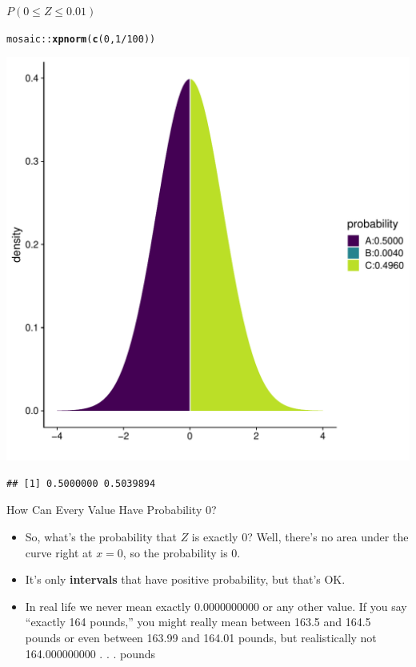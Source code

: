 \documentclass[10pt,handout]{beamer}\usepackage[]{graphicx}\usepackage[]{color}
\makeatletter
\newcommand{\hlnum}[1]{\textcolor[rgb]{0.686,0.059,0.569}{#1}}%
\newcommand{\hlopt}[1]{\textcolor[rgb]{0,0,0}{#1}}%
\newcommand{\hlstd}[1]{\textcolor[rgb]{0.345,0.345,0.345}{#1}}%
\newcommand{\hlkwd}[1]{\textcolor[rgb]{0.737,0.353,0.396}{\textbf{#1}}}%
\newenvironment{kframe}{%
 \def\at@end@of@kframe{}%
 \ifinner\ifhmode%
  \def\at@end@of@kframe{\end{minipage}}%
  \begin{minipage}{\columnwidth}%
 \fi\fi%
 \def\FrameCommand##1{\hskip\@totalleftmargin \hskip-\fboxsep
 \colorbox{shadecolor}{##1}\hskip-\fboxsep
     \hskip-\linewidth \hskip-\@totalleftmargin \hskip\columnwidth}%
 \MakeFramed {\advance\hsize-\width
   \@totalleftmargin\z@ \linewidth\hsize
   \@setminipage}}%
 {\par\unskip\endMakeFramed%
 \at@end@of@kframe}
\newenvironment{knitrout}{}{} %
\makeatother
\begin{document}
\begin{frame}[fragile]{$P(0 \leq Z \leq 0.01)$}

	
\begin{knitrout}\tiny
{}\color{fgcolor}\begin{kframe}
\begin{alltt}
\hlstd{mosaic}\hlopt{::}\hlkwd{xpnorm}\hlstd{(}\hlkwd{c}\hlstd{(}\hlnum{0}\hlstd{,}\hlnum{1}\hlopt{/}\hlnum{100}\hlstd{))}
\end{alltt}
\end{kframe}

{\centering \includegraphics[width=0.60\linewidth]{figure/unnamed-chunk-3-1} 

}


\begin{kframe}\begin{verbatim}
## [1] 0.5000000 0.5039894
\end{verbatim}
\end{kframe}
\end{knitrout}
\end{frame}



\begin{frame}{How Can Every Value Have Probability 0?}
	
	\begin{itemize}
		  \setlength{\itemsep}{10pt}
		
		\item So, what’s the probability that $Z$ is exactly 0? Well, there's no
		area under the curve right at $x = 0$, so the probability is 0.
		
		\item It's only \textbf{intervals} that have positive probability, but that's OK.
		
		\item In real life we never mean exactly 0.0000000000 or any other
		value. If you say ``exactly 164 pounds,'' you might really mean
		between 163.5 and 164.5 pounds or even between 163.99
		and 164.01 pounds, but realistically not 164.000000000 . . .
		pounds
	\end{itemize}
	
\end{frame}
\end{document}
